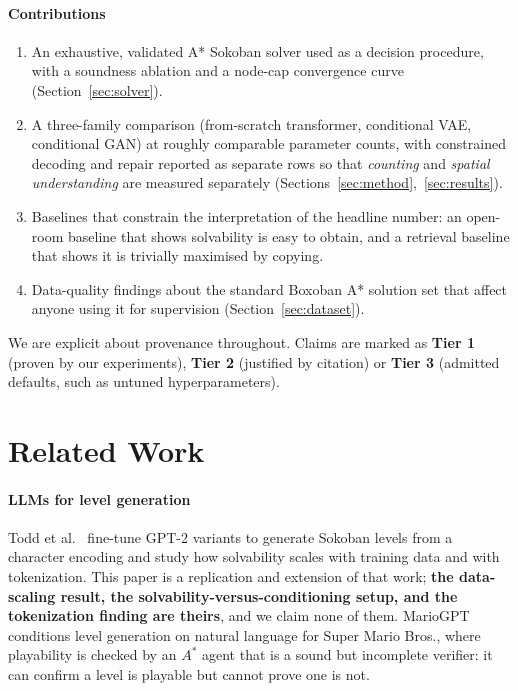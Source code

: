 \documentclass[conference]{IEEEtran}
\begin{document}
\paragraph{Contributions}
\begin{enumerate}
\item An exhaustive, validated A* Sokoban solver used as a decision procedure,
      with a soundness ablation and a node-cap convergence curve
      (Section~\ref{sec:solver}).
\item A three-family comparison (from-scratch transformer, conditional VAE,
      conditional GAN) at roughly comparable parameter counts, with
      constrained decoding and repair reported as separate rows so that
      \emph{counting} and \emph{spatial understanding} are measured separately
      (Sections~\ref{sec:method},~\ref{sec:results}).
\item Baselines that constrain the interpretation of the headline number: an
      open-room baseline that shows solvability is easy to obtain, and a
      retrieval baseline that shows it is trivially maximised by copying.
\item Data-quality findings about the standard Boxoban A* solution set that
      affect anyone using it for supervision (Section~\ref{sec:dataset}).
\end{enumerate}

We are explicit about provenance throughout. Claims are marked as
\textbf{Tier 1} (proven by our experiments), \textbf{Tier 2} (justified by
citation) or \textbf{Tier 3} (admitted defaults, such as untuned
hyperparameters).

\section{Related Work}

\paragraph{LLMs for level generation}
Todd et al.~\cite{todd2023level} fine-tune GPT-2 variants to generate Sokoban
levels from a character encoding and study how solvability scales with training
data and with tokenization. This paper is a replication and extension of that
work; \textbf{the data-scaling result, the solvability-versus-conditioning
setup, and the tokenization finding are theirs}, and we claim none of them.
MarioGPT~\cite{sudhakaran2023mariogpt} conditions level generation on natural
language for Super Mario Bros., where playability is checked by an $A^*$ agent
that is a sound but incomplete verifier: it can confirm a level is playable
but cannot prove one is not.
\end{document}
